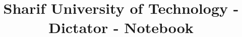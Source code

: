 \documentclass[10pt]{article}
\title{\vspace{-4ex}\Large{Sharif University of Technology - Dictator - Notebook}}
\author{}
\date{}
\begin{document}
\begin{landscape}
\begin{multicols}{2}

\maketitle
\vspace{-13ex}
{
\baselineskip
\tableofcontents
}
\pagestyle{fancy}



\end{multicols}
\end{landscape}
\end{document}
